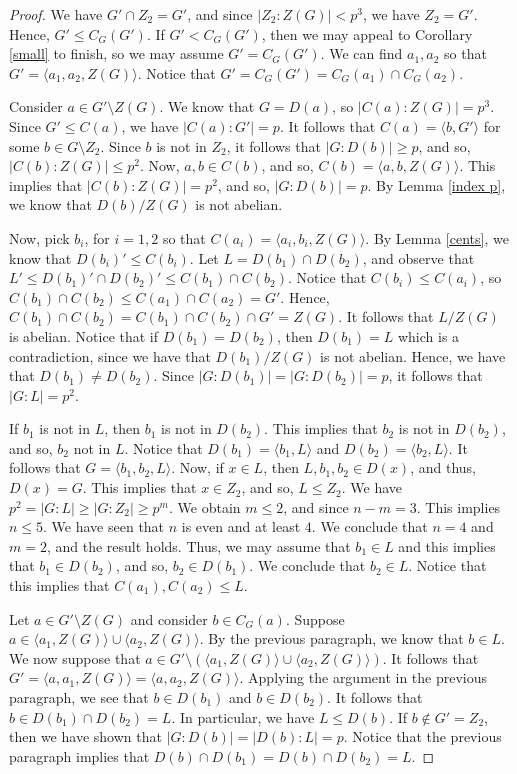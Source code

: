 \begin{proof}
We have $G' \cap Z_2 = G'$, and since $|Z_2:Z (G)| < p^3$, we have $Z_2 = G'$.  Hence, $G' \le C_G (G')$.  If $G' < C_G (G')$, then we may appeal to Corollary \ref{small} to finish, so we may assume $G' = C_G (G')$.  We can find $a_1, a_2$ so that $G' = \langle a_1, a_2, Z(G) \rangle$.  Notice that $G' = C_G (G') = C_G (a_1) \cap C_G (a_2)$.

Consider $a \in G' \setminus Z (G)$.  We know that $G = D (a)$, so $|C (a): Z (G)| = p^3$.  Since $G' \le C (a)$, we have $|C (a):G'| = p$.  It follows that $C (a) = \langle b, G' \rangle$ for some $b \in G \setminus Z_2$.  Since $b$ is not in $Z_2$, it follows that $|G:D (b)| \ge p$, and so, $|C (b): Z(G)| \le p^2$.  Now, $a, b \in C (b)$, and so, $C (b) = \langle a, b, Z (G) \rangle$.  This implies that $|C (b):Z (G)| = p^2$, and so, $|G:D (b)| = p$.  By Lemma \ref{index p}, we know that $D (b)/Z (G)$ is not abelian.

Now, pick $b_i$, for $i = 1, 2$ so that $C (a_i) = \langle a_i, b_i, Z (G) \rangle$.  By Lemma \ref{cents}, we know that $D (b_i)' \le C (b_i)$.  Let $L = D (b_1) \cap D (b_2)$, and observe that $L' \le D (b_1)' \cap D (b_2)' \le C (b_1) \cap C (b_2)$.  Notice that $C (b_i) \le C (a_i)$, so $C (b_1) \cap C (b_2) \le C (a_1) \cap C (a_2) = G'$.  Hence, $C (b_1) \cap C (b_2) = C (b_1) \cap C (b_2) \cap G' = Z (G)$.  It follows that $L/Z (G)$ is abelian.  Notice that if $D (b_1) = D (b_2)$, then $D (b_1) = L$ which is a contradiction, since we have that $D (b_1)/Z (G)$ is not abelian.  Hence, we have that $D (b_1) \ne D (b_2)$.  Since $|G:D (b_1)| = |G:D (b_2)| = p$, it follows that $|G:L| = p^2$.

If $b_1$ is not in $L$, then $b_1$ is not in $D (b_2)$.  This implies that $b_2$ is not in $D (b_2)$, and so, $b_2$ not in $L$.  Notice that $D (b_1) = \langle b_1, L \rangle$ and $D (b_2) = \langle b_2, L \rangle$.  It follows that $G = \langle b_1, b_2, L \rangle$.  Now, if $x \in L$, then $L, b_1, b_2 \in D (x)$, and thus, $D (x) = G$.  This implies that $x \in Z_2$, and so, $L \le Z_2$.  We have $p^2 = |G:L| \ge |G:Z_2| \ge p^{m}$.  We obtain $m \le 2$, and since $n - m = 3$. This implies $n \le 5$.  We have seen that $n$ is even and at least $4$.  We conclude that $n = 4$ and $m = 2$, and the result holds.  Thus, we may assume that $b_1 \in L$ and this implies that $b_1 \in D (b_2)$, and so, $b_2 \in D (b_1)$.  We conclude that $b_2 \in L$.  Notice that this implies that $C (a_1), C (a_2) \le L$.

Let $a \in G' \setminus Z (G)$ and consider $b \in C_G (a)$.  Suppose $a \in \langle a_1, Z (G) \rangle \cup \langle a_2, Z (G) \rangle$.  By the previous paragraph, we know that $b \in L$.  We now suppose that $a \in G' \setminus (\langle a_1, Z (G) \rangle \cup \langle a_2, Z (G) \rangle)$.  It follows that $G' = \langle a, a_1, Z (G) \rangle = \langle a, a_2, Z(G) \rangle$.  Applying the argument in the previous paragraph, we see that $b \in D (b_1)$ and $b \in D (b_2)$.  It follows that $b \in D (b_1) \cap D (b_2) = L$.  In particular, we have $L \le D (b)$.  If $b \not\in G' = Z_2$, then we have shown that $|G:D (b)| = |D (b):L| = p$.  Notice that the previous paragraph implies that $D(b) \cap D(b_1) = D(b) \cap D(b_2) = L$.


\end{proof}

